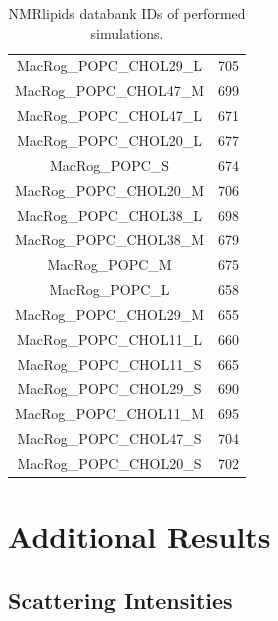 \documentclass[journal=jpcbfk]{achemso}
\begin{document}
\begin{table}[]
\begin{tabular}{cc}
MacRog\_POPC\_CHOL29\_L  &  705 \\ 
MacRog\_POPC\_CHOL47\_M  &  699 \\ 
MacRog\_POPC\_CHOL47\_L  &  671 \\ 
MacRog\_POPC\_CHOL20\_L  &  677 \\ 
MacRog\_POPC\_S  &  674 \\ 
MacRog\_POPC\_CHOL20\_M  &  706 \\ 
MacRog\_POPC\_CHOL38\_L  &  698 \\ 
MacRog\_POPC\_CHOL38\_M  &  679 \\ 
MacRog\_POPC\_M  &  675 \\ 
MacRog\_POPC\_L  &  658 \\ 
MacRog\_POPC\_CHOL29\_M  &  655 \\ 
MacRog\_POPC\_CHOL11\_L  &  660 \\ 
MacRog\_POPC\_CHOL11\_S  &  665 \\ 
MacRog\_POPC\_CHOL29\_S  &  690 \\ 
MacRog\_POPC\_CHOL11\_M  &  695 \\ 
MacRog\_POPC\_CHOL47\_S  &  704 \\ 
MacRog\_POPC\_CHOL20\_S  &  702 \\
\end{tabular}
\caption{NMRlipids databank IDs of performed simulations.}\label{IDtable}
\end{table}

\clearpage

\section{Additional Results}

\subsection{Scattering Intensities}
\end{document}
